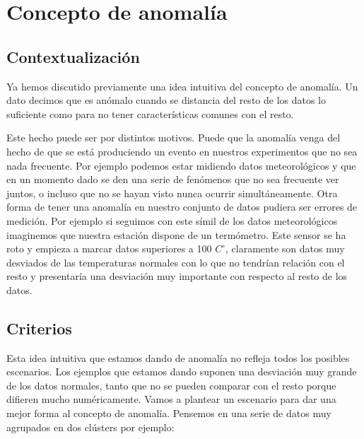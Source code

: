 \chapter{Concepto de anomalía}
\label{chapter:anomalia}

\section{Contextualización}

Ya hemos discutido previamente una idea intuitiva del concepto de anomalía. Un dato decimos que es anómalo cuando se distancia del resto de los datos lo suficiente como para no tener características comunes con el resto.

Este hecho puede ser por distintos motivos. Puede que la anomalía venga del hecho de que se está produciendo un evento en nuestros experimentos que no sea nada frecuente. Por ejemplo podemos estar midiendo datos meteorológicos y que en un momento dado se den una serie de fenómenos que no sea frecuente ver juntos, o incluso que no se hayan visto nunca ocurrir simultáneamente. Otra forma de tener una anomalía en nuestro conjunto de datos pudiera ser errores de medición. Por ejemplo si seguimos con este símil de los datos meteorológicos imaginemos que nuestra estación dispone de un termómetro. Este sensor se ha roto y empieza a marcar datos superiores a 100 $C^\circ$, claramente son datos muy desviados de las temperaturas normales con lo que no tendrían relación con el resto y presentaría una desviación muy importante con respecto al resto de los datos.

\section{Criterios}

Esta idea intuitiva que estamos dando de anomalía no refleja todos los posibles escenarios. Los ejemplos que estamos dando suponen una desviación muy grande de los datos normales, tanto que no se pueden comparar con el resto porque difieren mucho numéricamente. Vamos a plantear un escenario para dar una mejor forma al concepto de anomalía. Pensemos en una serie de datos muy agrupados en dos clústers por ejemplo:


